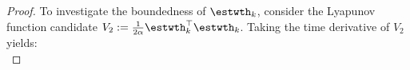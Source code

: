 \documentclass[letterpaper, journal]{IEEEtran}
\providecommand{\DIFdelbegin}{} %
\begin{document}
\begin{proof}
To investigate the boundedness of $\estwth_k$, consider the Lyapunov function candidate $V_2:=\tfrac{1}{2\alpha}\estwth_k^\top \estwth_k$.
Taking the time derivative of $V_2$ yields:
\begin{equation}
    \DIFdelbegin %

\end{equation}
\end{proof}
\end{document}
